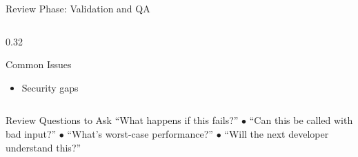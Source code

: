 \documentclass[aspectratio=169,10pt]{beamer}
\begin{document}
\begin{frame}{Review Phase: Validation and QA}
\begin{columns}[T]
\begin{column}{0.32\textwidth}
\begin{alertblock}{Common Issues}
\begin{itemize}
                    \item Security gaps
                \end{itemize}
            \end{alertblock}
        \end{column}
    \end{columns}
    \vspace{0.3cm}
    \begin{block}{Review Questions to Ask}
        ``What happens if this fails?'' $\bullet$ ``Can this be called with bad input?'' $\bullet$ ``What's worst-case performance?'' $\bullet$ ``Will the next developer understand this?''
    \end{block}

\end{frame}
\end{document}
